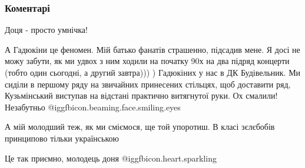  
 
 
 
 
\subsubsection{Коментарі}
\label{sec:30_08_2021.fb.helgis_gerus.1.semja_ukrainizacia_mova.cmt}

\begin{itemize} %

Доця - просто умнічка!

А Гадюкіни це феномен. Мій батько фанатів страшенно, підсадив мене. Я досі не
можу забути, як ми удвох з ним ходили на початку 90х на два підряд концерти
(тобто один сьогодні, а другий завтра))) ) Гадюкіних у нас в ДК Будівельник. Ми
сиділи в першому ряду на звичайних принесених стільцях, щоб доставити ряд,
Кузьмінський виступав на відстані практично витягнутої руки. Ох смалили!
Незабутньо  @igg{fbicon.beaming.face.smiling.eyes} 

\begin{itemize} %
 
А мій молодший теж, як ми сміємося, ще той упоротиш. В класі зєлєбобів принципово тільки українською
\end{itemize} %

 
Це так приємно, молодець доня @igg{fbicon.heart.sparkling} 


\end{itemize}

